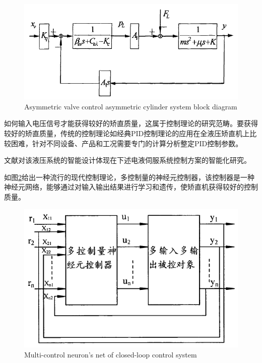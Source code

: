 \begin{figure}[!htp]
	\centering
	\includegraphics[width=\textwidth]{IMG/hycontrolsys.png}
		{Asymmetric valve control asymmetric cylinder system block diagram}
	\label{fig:hycontrolsys}
\end{figure}

如何输入电压信号才能获得较好的矫直质量，这属于控制理论的研究范畴。要获得较好的矫直质量，传统的控制理论如经典PID控制理论的应用在全液压矫直机上比较困难，针对不同设备、产品和工况需要专门的计算分析整定PID控制参数。

文献\parencite{zhinengjiaozhiji}对该液压系统的智能设计体现在下述电液伺服系统控制方案的智能化研究。

如图\ref{fig:netcontrol}给出一种流行的现代控制理论，多控制量的神经元控制器，该控制器是一种神经元网络，能够通过对输入输出结果进行学习和遗传，使矫直机获得较好的控制质量。

\begin{figure}[!htp]
	\centering
	\includegraphics[width=\textwidth]{IMG/netcontrol.png}
		{Multi-control neuron's net of closed-loop control system}
	\label{fig:netcontrol}
\end{figure}

